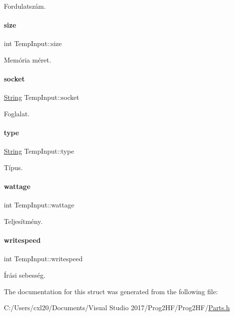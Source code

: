 Fordulatszám. 

\mbox{\label{struct_temp_input_adfc0eb32fac7de584c3872875b452550}} 
\paragraph{\texorpdfstring{size}{size}}
{\footnotesize\ttfamily int Temp\+Input\+::size}



Memória méret. 

\mbox{\label{struct_temp_input_a5142af446776f87e454134511f681887}} 
\paragraph{\texorpdfstring{socket}{socket}}
{\footnotesize\ttfamily \mbox{\hyperlink{class_string}{String}} Temp\+Input\+::socket}



Foglalat. 

\mbox{\label{struct_temp_input_a1a73f4b9c84caa8c463a4bad03cf433d}} 
\paragraph{\texorpdfstring{type}{type}}
{\footnotesize\ttfamily \mbox{\hyperlink{class_string}{String}} Temp\+Input\+::type}



Típus. 

\mbox{\label{struct_temp_input_a2764957397bba59e827c66aeb1821279}} 
\paragraph{\texorpdfstring{wattage}{wattage}}
{\footnotesize\ttfamily int Temp\+Input\+::wattage}



Teljesítmény. 

\mbox{\label{struct_temp_input_a3d5511c959e7c3531ce3bea3a6248d62}} 
\paragraph{\texorpdfstring{writespeed}{writespeed}}
{\footnotesize\ttfamily int Temp\+Input\+::writespeed}



Írási sebesség. 



The documentation for this struct was generated from the following file\+:\begin{DoxyCompactItemize}
\item 
C\+:/\+Users/cxl20/\+Documents/\+Visual Studio 2017/\+Prog2\+H\+F/\+Prog2\+H\+F/\mbox{\hyperlink{_parts_8h}{Parts.\+h}}\end{DoxyCompactItemize}
